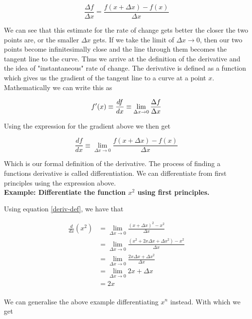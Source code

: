 \begin{equation} \label{gradient}
    \frac{\Delta f}{\Delta x} = \frac{f(x + \Delta x) - f(x)}{\Delta x}
\end{equation}

We can see that this estimate for the rate of change gets better the closer the two points are, or the smaller 
$\Delta x$ gets. If we take the limit of $\Delta x \to 0$, then our two points become infinitesimally close and the
line through them becomes the tangent line to the curve. Thus we arrive at the definition of the derivative and the
idea of "instantaneous" rate of change. The derivative is defined as a function which gives us the gradient of the 
tangent line to a curve at a point $x$. Mathematically we can write this as

\begin{equation*}
    f'(x) \equiv \frac{df}{dx} \equiv \lim_{\Delta x \to 0} \frac{\Delta f}{\Delta x}\\
\end{equation*}

Using the expression for the gradient above we then get

\begin{equation} \label{deriv-def}
    \frac{df}{dx} \equiv \lim_{\Delta x \to 0} \frac{f(x + \Delta x) - f(x)}{\Delta x}
\end{equation}

Which is our formal definition of the derivative. The process of finding a functions derivative is called 
differentiation. We can differentiate from first principles using the expression above.\\

\noindent\textbf{Example: Differentiate the function $x^2$ using first principles.}

Using equation \ref{deriv-def}, we have that

\begin{align*}
    \frac{d}{dx}(x^2) &= \lim_{\Delta x \to 0} \frac{(x + \Delta x)^2 - x^2}{\Delta x}\\
    &= \lim_{\Delta x \to 0} \frac{(x^2 + 2x\Delta x + \Delta x^2) - x^2}{\Delta x}\\
    &= \lim_{\Delta x \to 0} \frac{2x\Delta x + \Delta x^2}{\Delta x}\\
    &= \lim_{\Delta x \to 0} 2x + \Delta x\\
    &= 2x\\
\end{align*}

We can generalise the above example differentiating $x^n$ instead. With which we get

